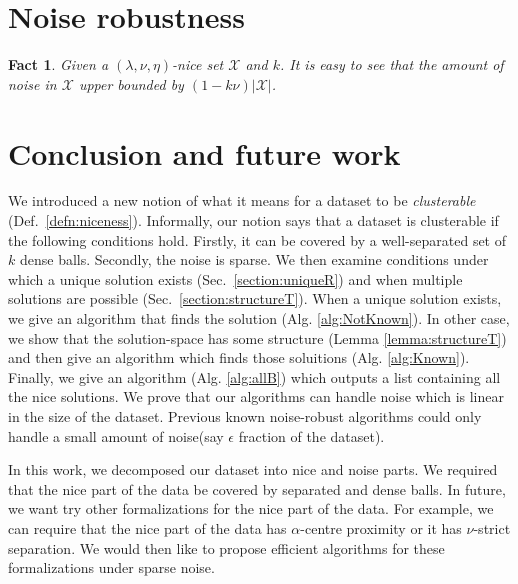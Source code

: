 \documentclass[twoside]{article}
\newcommand{\mc}{\mathcal}
\newtheorem{fact}[theorem]{Fact}
\begin{document}
\section{Noise robustness}
\label{sec:noise}
\begin{fact}
Given a $(\lambda, \nu, \eta)$-nice set $\mc X$ and $k$. It is easy to see that the amount of noise in $\mc X$ upper bounded by $(1-k\nu)|\mc X|$. 
\end{fact}

\section{Conclusion and future work}
\label{sec:future}
We introduced a new notion of what it means for a dataset to be {\it clusterable} (Def.~\ref{defn:niceness}). Informally, our notion says that a dataset is clusterable if the following conditions hold. Firstly, it can be covered by a well-separated set of $k$ dense balls. Secondly, the noise is sparse. We then examine conditions under which a unique solution exists (Sec.~\ref{section:uniqueR}) and when multiple solutions are possible (Sec.~\ref{section:structureT}). When a unique solution exists, we give an algorithm that finds the solution (Alg. \ref{alg:NotKnown}). In other case, we show that the solution-space has some structure (Lemma \ref{lemma:structureT}) and then give an algorithm which finds those soluitions (Alg. \ref{alg:Known}). Finally, we give an algorithm (Alg. \ref{alg:allB}) which outputs a list containing all the nice solutions. We prove that our algorithms can handle noise which is linear in the size of the dataset. Previous known noise-robust algorithms could only handle a small amount of noise(say $\epsilon$ fraction of the dataset).

In this work, we decomposed our dataset into nice and noise parts. We required that the nice part of the data be covered by separated and dense balls. In future, we want try other formalizations for the nice part of the data. For example, we can require that the nice part of the data has $\alpha$-centre proximity or it has $\nu$-strict separation. We would then like to propose efficient algorithms for these formalizations under sparse noise.

 


\end{document}
